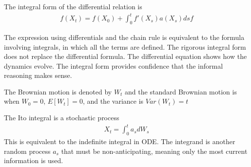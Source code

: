 The integral form of the differential relation is
\begin{align*}
f(X_t)=f(X_0) + \int_0^t f'(X_s)a(X_s)dsf
\end{align*}

The expression using differentials and the chain rule is equivalent to the formula involving integrals, in which all the terms are defined. The rigorous integral form does not replace the differential formula. The differential equation shows how the dynamics evolve. The integral form provides confidence that the informal reasoning makes sense.

The Brownian motion is denoted by $W_t$ and the standard Brownian motion is when $W_0=0$, $E[W_t]=0$, and the variance is $Var(W_t)=t$

The Ito integral is a stochastic process
\begin{align*}
X_t=\int_0^t a_s dW_s
\end{align*}
This is equivalent to the indefinite integral in ODE. The integrand is another random process $a_s$ that must be non-anticipating, meaning only the most current information is used.

